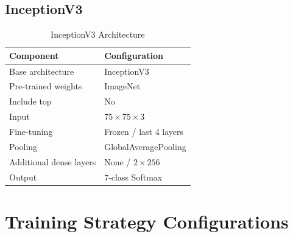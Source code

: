\documentclass[12pt, a4paper]{report}
\let\oldsection\section
\renewcommand{\section}{%
    \Needspace{6\baselineskip}%
    \oldsection
}
\let\oldsubsection\subsection
\renewcommand{\subsection}{%
    \Needspace{6\baselineskip}%
    \oldsubsection
}
\begin{document}
			\subsection{InceptionV3}
				
				\begin{table}[H]
					\centering
					\caption{InceptionV3 Architecture}
					\label{tab:inception3}
					\begin{tabular}{ll}
						\toprule
						Component & Configuration  \\	
						\midrule
						Base architecture & InceptionV3 \\
						Pre-trained weights & ImageNet \\
						Include top & No \\
						Input & $75\times75\times3$ \\
						Fine-tuning & Frozen / last 4 layers \\
						Pooling & GlobalAveragePooling \\
						Additional dense layers & None / $2\times256$ \\
						Output & 7-class Softmax \\
						\bottomrule
					\end{tabular}
				\end{table}
	
		\section{Training Strategy Configurations}
		
\end{document}
